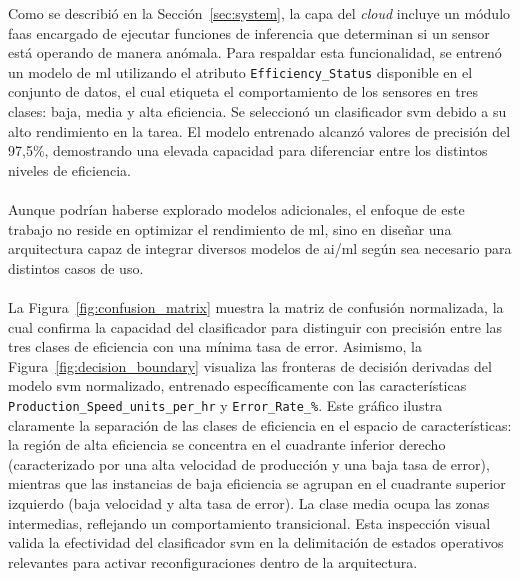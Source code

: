 Como se describió en la Sección~\ref{sec:system}, la capa del \textit{cloud} incluye un módulo \gls{faas} encargado de ejecutar funciones de inferencia que determinan si un sensor está operando de manera anómala. Para respaldar esta funcionalidad, se entrenó un modelo de \gls{ml} utilizando el atributo \texttt{Efficiency\_Status} disponible en el conjunto de datos, el cual etiqueta el comportamiento de los sensores en tres clases: baja, media y alta eficiencia. Se seleccionó un clasificador \gls{svm} debido a su alto rendimiento en la tarea. El modelo entrenado alcanzó valores de precisión del 97,5\%, demostrando una elevada capacidad para diferenciar entre los distintos niveles de eficiencia.\\
\\
Aunque podrían haberse explorado modelos adicionales, el enfoque de este trabajo no reside en optimizar el rendimiento de \gls{ml}, sino en diseñar una arquitectura capaz de integrar diversos modelos de \gls{ai}/\gls{ml} según sea necesario para distintos casos de uso.\\
\\
La Figura~\ref{fig:confusion_matrix} muestra la matriz de confusión normalizada, la cual confirma la capacidad del clasificador para distinguir con precisión entre las tres clases de eficiencia con una mínima tasa de error. Asimismo, la Figura~\ref{fig:decision_boundary} visualiza las fronteras de decisión derivadas del modelo \gls{svm} normalizado, entrenado específicamente con las características \texttt{Production\_Speed\_units\_per\_hr} y \texttt{Error\_Rate\_\%}. Este gráfico ilustra claramente la separación de las clases de eficiencia en el espacio de características: la región de alta eficiencia se concentra en el cuadrante inferior derecho (caracterizado por una alta velocidad de producción y una baja tasa de error), mientras que las instancias de baja eficiencia se agrupan en el cuadrante superior izquierdo (baja velocidad y alta tasa de error). La clase media ocupa las zonas intermedias, reflejando un comportamiento transicional. Esta inspección visual valida la efectividad del clasificador \gls{svm} en la delimitación de estados operativos relevantes para activar reconfiguraciones dentro de la arquitectura.


